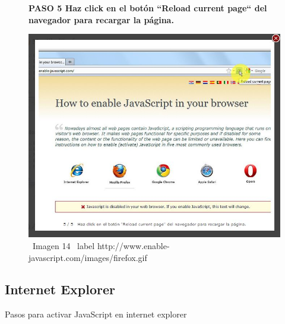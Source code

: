 \documentclass[11pt]{article} %
\begin{document}
\begin{figure}
\begin{center}
\begin{center}
\bf PASO 5
Haz click en el botón ``Reload current page`` del navegador para recargar la página.
\newline
\end{center}
\includegraphics[height=8 cm, width=8 cm] {imagenes/firefox 05.jpg}
\newline
\newline
\ Imagen 14
\ label {http://www.enable-javascript.com/images/firefox.gif }

\end{center}
\end{figure}

\newpage
\subsection{Internet Explorer}

Pasos para activar JavaScript en internet explorer
\end{document}
